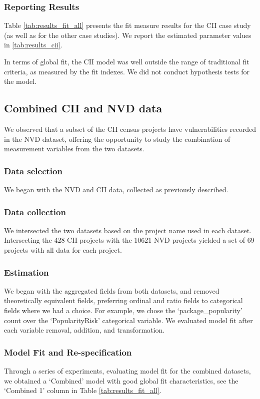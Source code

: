 \subsubsection{Reporting Results}

Table \ref{tab:results_fit_all} presents the fit measure results for the CII case study (as well as for the other case studies). We report the estimated parameter values in \ref{tab:results_cii}.

In terms of global fit, the CII model was well outside the range of traditional fit criteria, as measured by the fit indexes. We did not conduct hypothesis tests for the model. 

\subsection{Combined CII and NVD data}
We observed that a subset of the CII census projects have vulnerabilities recorded in the NVD dataset, offering the opportunity to study the combination of measurement variables from the two datasets.  

\subsubsection{Data selection}
We began with the NVD and CII data, collected as previously described. 

\subsubsection{Data collection}
We intersected the two datasets based on the project name used in each dataset. Intersecting the 428 CII projects with the 10621 NVD projects yielded a set of 69 projects with all data for each project.

\subsubsection{Estimation}
We began with the aggregated fields from both datasets, and removed theoretically equivalent fields, preferring ordinal and ratio fields to categorical fields where we had a choice. For example, we chose the `package\_popularity' count over the `PopularityRisk' categorical variable. We evaluated model fit after each variable removal, addition, and transformation.

\subsubsection{Model Fit and Re-specification}
Through a series of experiments, evaluating model fit for the combined datasets, we obtained a `Combined' model with good global fit characteristics, see the `Combined 1' column in Table \ref{tab:results_fit_all}.

